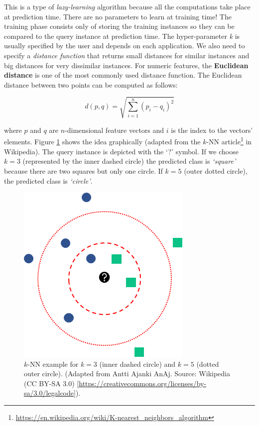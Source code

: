 \documentclass[
  11pt,
]{krantz}
\begin{document}
This is a type of \emph{lazy-learning} algorithm because all the computations take place at prediction time. There are no parameters to learn at training time! The training phase consists only of storing the training instances so they can be compared to the query instance at prediction time. The hyper-parameter \emph{k} is usually specified by the user and depends on each application. We also need to specify a \emph{distance function} that returns small distances for similar instances and big distances for very dissimilar instances. For numeric features, the \textbf{Euclidean distance} is one of the most commonly used distance function. The Euclidean distance between two points can be computed as follows:

\begin{equation}
  d\left(p,q\right) = \sqrt{\sum_{i=1}^n{\left(p_i-q_i\right)^2}}
  \label{eq:euclideanDistance}
\end{equation}

where \(p\) and \(q\) are \(n\)-dimensional feature vectors and \(i\) is the index to the vectors' elements. Figure \ref{fig:simpleKnn} shows the idea graphically (adapted from the \(k\)-NN article\footnote{\url{https://en.wikipedia.org/wiki/K-nearest_neighbors_algorithm}} in Wikipedia). The query instance is depicted with the `?' symbol. If we choose \(k=3\) (represented by the inner dashed circle) the predicted class is \emph{`square'} because there are two squares but only one circle. If \(k=5\) (outer dotted circle), the predicted class is \emph{`circle'}.



\begin{figure}

{\centering \includegraphics[width=0.4\linewidth]{images/knn} 

}

\caption{\(k\)-NN example for \(k=3\) (inner dashed circle) and \(k=5\) (dotted outer circle). (Adapted from Antti Ajanki AnAj. Source: Wikipedia (CC BY-SA 3.0) {[}\url{https://creativecommons.org/licenses/by-sa/3.0/legalcode}{]}).}\label{fig:simpleKnn}
\end{figure}
\end{document}
